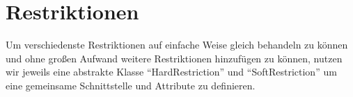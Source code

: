\section{Restriktionen}\label{sec:restrictions}
Um verschiedenste Restriktionen auf einfache Weise gleich behandeln zu können
und ohne großen Aufwand weitere Restriktionen hinzufügen zu können,
nutzen wir jeweils eine abstrakte Klasse \enquote{HardRestriction} und \enquote{SoftRestriction}
um eine gemeinsame Schnittstelle und Attribute zu definieren.



